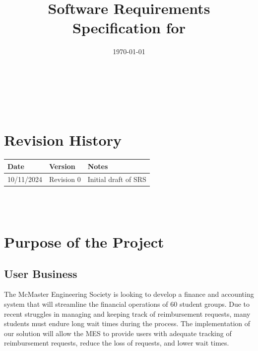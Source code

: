 \documentclass[12pt]{article}
\begin{document}
\title{Software Requirements Specification for \progname} 
\author{\authname}
\date{\today}
	
\maketitle

~\newpage


\tableofcontents

~\newpage

\section*{Revision History}

\begin{tabularx}{\textwidth}{p{3cm}p{2cm}X}
\toprule {\textbf{Date}} & {\textbf{Version}} & {\textbf{Notes}}\\
\midrule
10/11/2024 & Revision 0 & Initial draft of SRS\\
\bottomrule
\end{tabularx}

~\\

~\newpage
\section{Purpose of the Project}
\subsection{User Business}
The McMaster Engineering Society is looking to develop a finance and accounting system that will streamline the financial operations of 60 student groups. Due to recent struggles in managing and keeping track of reimbursement requests, many students must endure long wait times during the process. The implementation of our solution will allow the MES to provide users with adequate tracking of reimbursement requests, reduce the loss of requests, and lower wait times.
\end{document}
